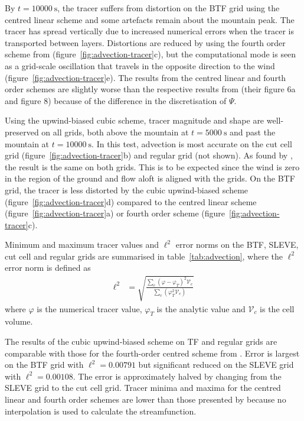 \documentclass[twocol]{ametsoc}
\begin{document}
By \(t = \SI{10000}{\second}\), the tracer suffers from distortion on the BTF grid using the centred linear scheme and some artefacts remain about the mountain peak.  The tracer has spread vertically due to increased numerical errors when the tracer is transported between layers.  Distortions are reduced by using the fourth order scheme from \citet{schaer2002} (figure~\ref{fig:advection-tracer}c), but the computational mode is seen as a grid-scale oscillation that travels in the opposite direction to the wind (figure~\ref{fig:advection-tracer}e).  The results from the centred linear and fourth order schemes are slightly worse than the respective results from \citet{schaer2002} (their figure 6a and figure 8) because of the difference in the discretisation of $\Psi$.

Using the upwind-biased cubic scheme, tracer magnitude and shape are well-preserved on all grids, both above the mountain at \(t = \SI{5000}{\second}\) and past the mountain at \(t = \SI{10000}{\second}\).  In this test, advection is most accurate on the cut cell grid (figure~\ref{fig:advection-tracer}b) and regular grid (not shown).  As found by \citet{good2014}, the result is the same on both grids.  This is to be expected since the wind is zero in the region of the ground and flow aloft is aligned with the grids.  On the BTF grid, the tracer is less distorted by the cubic upwind-biased scheme (figure~\ref{fig:advection-tracer}d) compared to the centred linear scheme (figure~\ref{fig:advection-tracer}a) or fourth order scheme (figure~\ref{fig:advection-tracer}c).

Minimum and maximum tracer values and \(\ell^2\) error norms on the BTF, SLEVE, cut cell and regular grids are summarised in table~\ref{tab:advection}, where the \(\ell^2\) error norm is defined as 
\begin{align}
	\ell^2 &= \sqrt{\frac{\sum_c \left( \varphi - \varphi_{T} \right)^2 \mathcal{V}_c}{\sum_c \left( \varphi_T^2 \mathcal{V}_c \right)}}
\end{align}
where $\varphi$ is the numerical tracer value, $\varphi_T$ is the analytic value and $\mathcal{V}_c$ is the cell volume.

The results of the cubic upwind-biased scheme on TF and regular grids are comparable with those for the fourth-order centred scheme from \citet{schaer2002}.  Error is largest on the BTF grid with \(\ell^2 = \num{0.00791}\) but significant reduced on the SLEVE grid with \(\ell^2 = \num{0.00108}\).  The error is approximately halved by changing from the SLEVE grid to the cut cell grid.
Tracer minima and maxima for the centred linear and fourth order schemes are lower than those presented by \citet{schaer2002} because no interpolation is used to calculate the streamfunction.
\end{document}
